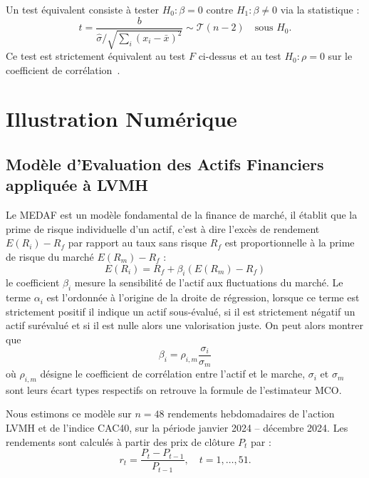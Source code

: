 \documentclass[12pt,a4paper]{article}
\theoremstyle{definition}
\theoremstyle{remark}
\newcommand{\xbar}{\bar{x}}
\begin{document}
Un test équivalent consiste à tester $H_0 : \beta = 0$ contre $H_1 : \beta \neq 0$
via la statistique :
\[
  t = \frac{b}{\hat{\sigma}/\sqrt{\sum_i(x_i-\xbar)^2}} \sim \mathcal{T}(n-2)
  \quad \text{sous } H_0.
\]
Ce test est strictement équivalent au test $F$ ci-dessus et au test $H_0 : \rho = 0$
sur le coefficient de corrélation~\cite{saporta2006}.





\section{Illustration Numérique}
\label{sec:numerique}


\subsection{Modèle d'Evaluation des Actifs Financiers appliquée à LVMH}

Le MEDAF est un modèle fondamental de la finance de marché, il établit que la prime de risque individuelle d'un actif, c'est à dire l'excès de rendement $E(R_i) - R_f$ par rapport au taux sans risque $R_f$  est proportionnelle à la prime de risque du marché $E(R_m) - R_f$ :
\begin{equation}
    E(R_i)= R_f + \beta_i(E(R_m)-R_f)
\end{equation}
le coefficient $\beta_i$ mesure la sensibilité de l'actif aux fluctuations du marché. Le terme $\alpha_i$ est l'ordonnée à l'origine de la droite de régression, lorsque ce terme est strictement positif il indique un actif sous-évalué, si il est strictement négatif un actif surévalué et si il est nulle alors une valorisation juste.
On peut alors montrer que \begin{equation}
    \beta_i = \rho_{i,m} \frac{\sigma_i}{\sigma_m}
\end{equation}
où $\rho_{i,m}$ désigne le coefficient de corrélation entre l'actif et le marche, $\sigma_i$ et  $\sigma_m$ sont leurs écart types respectifs on retrouve la formule de l'estimateur MCO.

Nous estimons ce modèle sur $n = 48$ rendements hebdomadaires de l'action
LVMH et de l'indice CAC40, sur la période janvier 2024 -- décembre 2024.
Les rendements sont calculés à partir des prix de clôture $P_t$ par :
\[
    r_t = \frac{P_t - P_{t-1}}{P_{t-1}}, \quad t = 1, \ldots, 51.
\]
\end{document}
